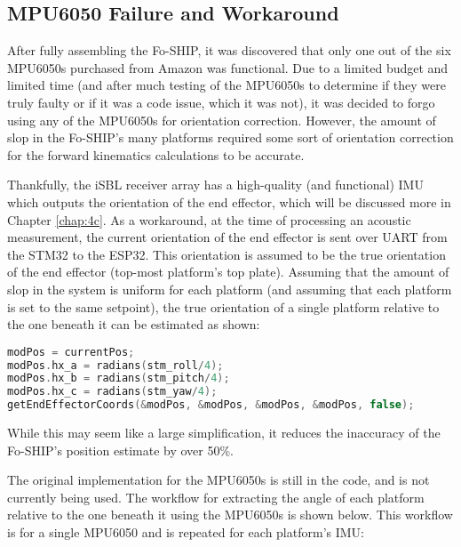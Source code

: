 \documentclass[11pt]{ucthesisCP}
\begin{document}
\subsection{MPU6050 Failure and Workaround} \label{ssec:2s5s2}
After fully assembling the Fo-SHIP, it was discovered that only one out of the six MPU6050s purchased from Amazon was functional. Due to a limited budget and limited time (and after much testing of the MPU6050s to determine if they were truly faulty or if it was a code issue, which it was not), it was decided to forgo using any of the MPU6050s for orientation correction. However, the amount of slop in the Fo-SHIP’s many platforms required some sort of orientation correction for the forward kinematics calculations to be accurate. 

Thankfully, the iSBL receiver array has a high-quality (and functional) IMU which outputs the orientation of the end effector, which will be discussed more in Chapter \ref{chap:4c}. As a workaround, at the time of processing an acoustic measurement, the current orientation of the end effector is sent over UART from the STM32 to the ESP32. This orientation is assumed to be the true orientation of the end effector (top-most platform’s top plate). Assuming that the amount of slop in the system is uniform for each platform (and assuming that each platform is set to the same setpoint), the true orientation of a single platform relative to the one beneath it can be estimated as shown:

\begin{lstlisting}[language=C++]
modPos = currentPos;
modPos.hx_a = radians(stm_roll/4);
modPos.hx_b = radians(stm_pitch/4);
modPos.hx_c = radians(stm_yaw/4);
getEndEffectorCoords(&modPos, &modPos, &modPos, &modPos, false);
\end{lstlisting}

While this may seem like a large simplification, it reduces the inaccuracy of the Fo-SHIP’s position estimate by over 50\%. 

The original implementation for the MPU6050s is still in the code, and is not currently being used. The workflow for extracting the angle of each platform relative to the one beneath it using the MPU6050s is shown below. This workflow is for a single MPU6050 and is repeated for each platform's IMU:
\end{document}

